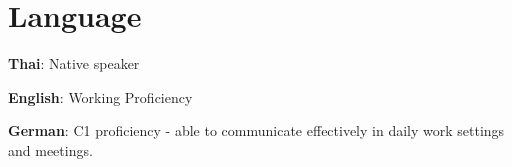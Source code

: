 \section{Language}
\resumeSubHeadingListStart
\item{
    \textbf{Thai}{: Native speaker}
  }
\item{
    \textbf{English}{: Working Proficiency}
  }
\item{
    \textbf{German}{: C1 proficiency - able to communicate effectively in daily work settings and meetings.}
  }
\resumeSubHeadingListEnd
